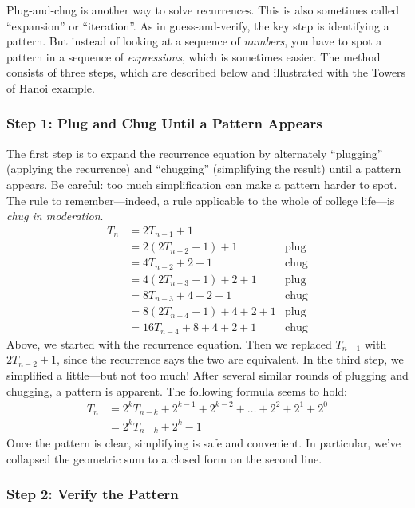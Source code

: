 Plug-and-chug is another way to solve recurrences.  This is also
sometimes called ``expansion'' or ``iteration''.  As in
guess-and-verify, the key step is identifying a pattern.  But instead
of looking at a sequence of \emph{numbers}, you have to spot a pattern
in a sequence of \emph{expressions}, which is sometimes easier.  The
method consists of three steps, which are described below and
illustrated with the Towers of Hanoi example.

\subsubsection*{Step 1: Plug and Chug Until a Pattern Appears}

The first step is to expand the recurrence equation by alternately
``plugging'' (applying the recurrence) and ``chugging'' (simplifying the
result) until a pattern appears.  Be careful: too much simplification
can make a pattern harder to spot.  The rule to remember---indeed, a
rule applicable to the whole of college life---is \emph{chug in
  moderation}.
\begin{align*}
T_n & = 2T_{n-1} + 1 \\
  & = 2 (2 T_{n-2} + 1)  + 1 & \text{plug} \\
  & = 4 T_{n-2} + 2 + 1 & \text{chug} \\
  & = 4 (2 T_{n-3} + 1) + 2 + 1 & \text{plug} \\
  & = 8 T_{n-3} + 4 + 2 + 1 & \text{chug} \\
  & = 8 (2 T_{n-4} + 1) + 4 + 2 + 1 & \text{plug} \\
  & = 16 T_{n-4} + 8 + 4 + 2 + 1 & \text{chug}
\end{align*}
Above, we started with the recurrence equation.  Then we replaced
$T_{n-1}$ with $2 T_{n-2} + 1$, since the recurrence says the two are
equivalent.  In the third step, we simplified a little---but not too
much!  After several similar rounds of plugging and chugging, a
pattern is apparent.  The following formula seems to hold:
\begin{align*}
T_n & = 2^k T_{n - k} + 2^{k-1} + 2^{k-2} + \ldots + 2^2 + 2^1 + 2^0 \\
   & = 2^k T_{n-k} + 2^k - 1
\end{align*}
Once the pattern is clear, simplifying is safe and convenient.  In
particular, we've collapsed the geometric sum to a closed form on the
second line.

\subsubsection*{Step 2:  Verify the Pattern}

